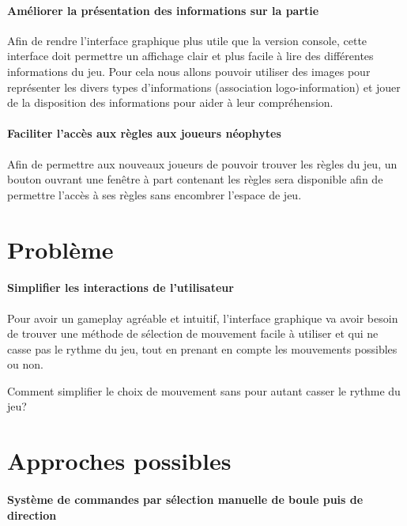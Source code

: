 \documentclass{scrreprt}
\begin{document}
			\paragraph{Améliorer la présentation des informations sur la partie}
			
			Afin de rendre l'interface graphique plus utile que la version console, cette interface doit permettre un affichage clair et plus facile à lire des différentes informations du jeu. Pour cela nous allons pouvoir utiliser des images pour représenter les divers types d'informations (association logo-information) et jouer de la disposition des informations pour aider à leur compréhension.
			
			\paragraph{Faciliter l'accès aux règles aux joueurs néophytes}
			
			Afin de permettre aux nouveaux joueurs de pouvoir trouver les règles du jeu, un bouton ouvrant une fenêtre à part contenant les règles sera disponible afin de permettre l'accès à ses règles sans encombrer l'espace de jeu.
			
			
		\section{Problème}
			
			\paragraph{Simplifier les interactions de l'utilisateur}
			
			Pour avoir un gameplay agréable et intuitif, l'interface graphique va avoir besoin de trouver une méthode de sélection de mouvement facile à utiliser et qui ne casse pas le rythme du jeu, tout en prenant en compte les mouvements possibles ou non.
			
			Comment simplifier le choix de mouvement sans pour autant casser le rythme du jeu?
			
		\section{Approches possibles}
			\paragraph{Système de commandes par sélection manuelle de boule puis de direction}
			
\end{document}
